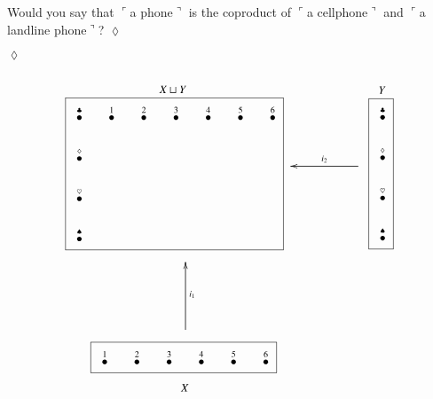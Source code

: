 \documentclass[a4paper]{book}
\def\tn{\textnormal}
\newcommand{\LMO}[1]{\stackrel{#1}{\bullet}}
\newcommand{\fakebox}[1]{\tn{$\ulcorner$#1$\urcorner$}}
\theoremstyle{myth}
\newtheorem{exampleENG}[envENG]{\begin{english}Example\end{english}}
\newtheorem{excENG}[envENG]{\begin{english}Exercise\end{english}}
\newenvironment{exerciseENG}{\begin{excENG}}{\hspace*{\fill}$\lozenge$\end{excENG}}
\newtheorem{exampleRUS}[envRUS]{\begin{russian}Пример\end{russian}}
\newtheorem{excRUS}[envRUS]{\begin{russian}Упражнение\end{russian}}
\newenvironment{exerciseRUS}{\begin{excRUS}}{\hspace*{\fill}$\lozenge$\end{excRUS}}
\begin{document}
\begin{english}
\begin{exampleRUS}\label{ex:airplanes}
\begin{russian} \end{russian}
\end{exampleRUS}

\begin{exerciseENG}
Would you say that \fakebox{a phone} is the coproduct of \fakebox{a cellphone} and \fakebox{a landline phone}? 
\end{exerciseENG}

\begin{exerciseRUS}
\begin{russian} \end{russian}
\end{exerciseRUS}

\begin{exampleENG}\label{ex:coprod of dots}
\begin{align}
\parbox{2.4in}{\begin{center}\small $X\sqcup Y$\vspace{-.1in}\end{center}\fbox{
\xymatrix@=15pt{
\LMO{\clubsuit}&\LMO{1}&\LMO{2}&\LMO{3}&\LMO{4}&\LMO{5}&\LMO{6}\\\LMO{\diamondsuit}\\\LMO{\heartsuit}\\\LMO{\spadesuit}
}}}
\parbox{.9in}{
\xymatrix{~&&\ar[ll]_{i_2}~}
}
\parbox{.3in}{\begin{center}\small $Y$\vspace{-.1in}\end{center}\fbox{
\xymatrix@=15pt{
\LMO{\clubsuit}\\\LMO{\diamondsuit}\\\LMO{\heartsuit}\\\LMO{\spadesuit}
}}}
\\\nonumber
\parbox{1in}{\hspace{-1.4in}\xymatrix{~\\\\\ar[uu]_{i_1}}}
\\\nonumber
\parbox{2.1in}{\hspace{-1.3in}\fbox{
\xymatrix@=15pt{
\LMO{1}&\LMO{2}&\LMO{3}&\LMO{4}&\LMO{5}&\LMO{6}
}}\begin{center}\hspace{-2.6in}\small$X$\end{center}}
\end{align}
\end{exampleENG}


\end{english}
\end{document}
